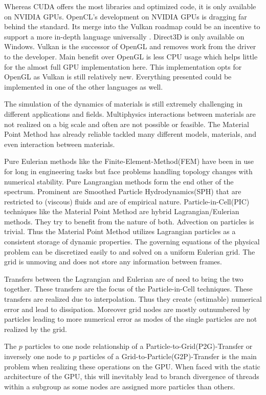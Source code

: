 \documentclass[m,times]{cgMA}
\begin{document}
Whereas CUDA offers the most libraries and optimized code, it is only available on NVIDIA GPUs. OpenCL's development on NVIDIA GPUs is dragging far behind the standard. Its merge into the Vulkan roadmap could be an incentive to support a more in-depth language universally \cite{OPENCL:ROADMAP}. Direct3D is only available on Windows. Vulkan is the successor of OpenGL and removes work from the driver to the developer. Main benefit over OpenGL is less CPU usage which helps little for the almost full GPU implementation here. This implementation opts for OpenGL as Vulkan is still relatively new. Everything presented could be implemented in one of the other languages as well.

The simulation of the dynamics of materials is still extremely challenging in different applications and fields. Multiphysics interactions between materials are not realized on a big scale and often are not possible or feasible. The Material Point Method has already reliable tackled many different models, materials, and even interaction between materials.

Pure Eulerian methods like the Finite-Element-Method(FEM) have been in use for long in engineering tasks but face problems handling topology changes with numerical stability. Pure Langrangian methods form the end other of the spectrum. Prominent are Smoothed Particle Hydrodynamics(SPH) that are restricted to (viscous) fluids and are of empirical nature. Particle-in-Cell(PIC) techniques like the Material Point Method are hybrid Lagrangian/Eulerian methods. They try to benefit from the nature of both. Advection on particles is trivial. Thus the Material Point Method utilizes Lagrangian particles as a consistent storage of dynamic properties. The governing equations of the physical problem can be discretized easily to and solved on a uniform Eulerian grid. The grid is unmoving and does not store any information between frames.

Transfers between the Lagrangian and Eulerian are of need to bring the two together. These transfers are the focus of the Particle-in-Cell techniques. These transfers are realized due to interpolation. Thus they create (estimable) numerical error and lead to dissipation. Moreover grid nodes are mostly outnumbered by particles leading to more numerical error as modes of the single particles are not realized by the grid.

The $p$ particles to one node relationship of a Particle-to-Grid(P2G)-Transfer or inversely one node to $p$ particles of a Grid-to-Particle(G2P)-Transfer is the main problem when realizing these operations on the GPU. When faced with the static architecture of the GPU, this will inevitably lead to branch divergence of threads within a subgroup as some nodes are assigned more particles than others.
\end{document}

